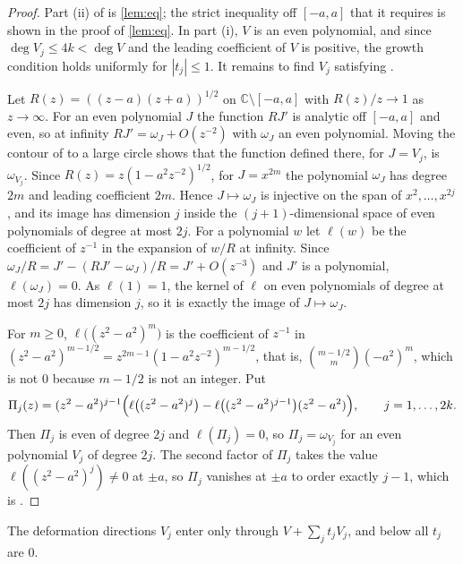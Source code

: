 \documentclass[11pt]{article}
\theoremstyle{remark}
\newcommand{\C}{\mathbb{C}}
\begin{document}
\begin{proof}
Part (ii) of \cite[Assumptions~1.1]{DDL} is \cref{lem:eq}; the strict inequality off $[-a,a]$ that it requires
is shown in the proof of \cref{lem:eq}. In part (i), $V$ is an even polynomial, and since
$\deg V_j\le4k<\deg V$ and the leading coefficient of $V$ is positive, the growth condition \cite[(1.2)]{DDL} holds
uniformly for $|t_j|\le1$. It remains to find $V_j$ satisfying \cite[(1.41)]{DDL}.

Let $R(z)=((z-a)(z+a))^{1/2}$ on $\C\setminus[-a,a]$ with $R(z)/z\to1$ as $z\to\infty$. For an even polynomial $J$ the function
$RJ'$ is analytic off $[-a,a]$ and even, so at infinity $RJ'=\omega_J+O(z^{-2})$ with $\omega_J$ an even polynomial.
Moving the contour of \cite[(1.42)]{DDL} to a large circle shows that the function defined there, for $J=V_j$, is
$\omega_{V_j}$. Since $R(z)=z(1-a^2z^{-2})^{1/2}$, for $J=x^{2m}$ the polynomial $\omega_J$ has degree $2m$ and leading
coefficient $2m$. Hence $J\mapsto\omega_J$ is injective on the span of $x^2,\dots,x^{2j}$, and its image has dimension
$j$ inside the $(j+1)$-dimensional space of even polynomials of degree at most $2j$. For a polynomial $w$ let $\ell(w)$ be
the coefficient of $z^{-1}$ in the expansion of $w/R$ at infinity. Since $\omega_J/R=J'-(RJ'-\omega_J)/R=J'+O(z^{-3})$
and $J'$ is a polynomial, $\ell(\omega_J)=0$. As $\ell(1)=1$, the kernel of $\ell$ on even polynomials of degree at
most $2j$ has dimension $j$, so it is exactly the image of $J\mapsto\omega_J$.

For $m\ge0$, $\ell\bigl((z^2-a^2)^m\bigr)$ is the coefficient of $z^{-1}$ in
$(z^2-a^2)^{m-1/2}=z^{2m-1}(1-a^2z^{-2})^{m-1/2}$, that is, $\binom{m-1/2}{m}(-a^2)^m$, which is not $0$ because
$m-1/2$ is not an integer. Put
\[
\Pi_j(z)=(z^2-a^2)^{j-1}\Bigl(\ell\bigl((z^2-a^2)^j\bigr)-\ell\bigl((z^2-a^2)^{j-1}\bigr)(z^2-a^2)\Bigr),\qquad j=1,\dots,2k.
\]
Then $\Pi_j$ is even of degree $2j$ and $\ell(\Pi_j)=0$, so $\Pi_j=\omega_{V_j}$ for an even polynomial $V_j$ of
degree $2j$. The second factor of $\Pi_j$ takes the value $\ell((z^2-a^2)^j)\ne0$ at $\pm a$, so $\Pi_j$ vanishes at
$\pm a$ to order exactly $j-1$, which is \cite[(1.41)]{DDL}.
\end{proof}

The deformation directions $V_j$ enter only through $V+\sum_jt_jV_j$, and below all $t_j$ are $0$.
\end{document}
